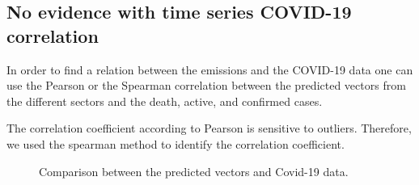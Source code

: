 \subsection*{No evidence with time series COVID-19 correlation}
In order to find a relation between the \co emissions and the COVID-19 data one can use the Pearson or the Spearman correlation between the predicted vectors from the different sectors and the death, active, and confirmed cases.

The correlation coefficient according to Pearson is sensitive to outliers. Therefore, we used the spearman method to identify the correlation coefficient.

\begin{figure}[h!]
	\centering
	\caption{Comparison between the predicted vectors and Covid-19 data.}
	\label{fig:Covid-predictedVectors}
\end{figure}

